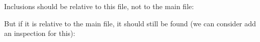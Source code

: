 \documentclass[../main.tex]{../subfiles}
\begin{document}
    Inclusions should be relative to this file, not to the main file:
    
    But if it is relative to the main file, it should still be found (we can consider add an inspection for this):
    
\end{document}
